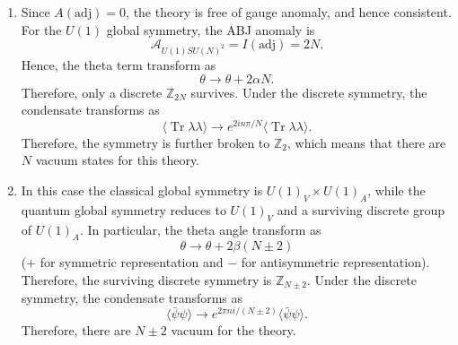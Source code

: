 \begin{solution}
    \begin{enumerate}[label=\alph*)]
    \item Since $A(\mathrm{adj}) =0$, the theory is free of gauge anomaly, and hence consistent. For the $U(1)$ global symmetry, the ABJ anomaly is
    \begin{equation}
        \mathcal{A}_{U(1)SU(N)^2} = I(\mathrm{adj}) = 2N.
    \end{equation}
    Hence, the theta term transform as
    \begin{equation}
        \theta \to \theta + 2\alpha N.
    \end{equation}
    Therefore, only a discrete $\mathbb{Z}_{2N}$ survives. Under the discrete symmetry, the condensate transforms as
    \begin{equation}
        \langle\operatorname{Tr}\lambda\lambda\rangle \to e^{2in\pi/N}\langle\operatorname{Tr}\lambda\lambda\rangle.
    \end{equation}
    Therefore, the symmetry is further broken to $\mathbb{Z}_{2}$, which means that there are $N$ vacuum states for this theory.

    \item In this case the classical global symmetry is $U(1)_V \times U(1)_A$, while the quantum global symmetry reduces to $U(1)_V$ and a surviving discrete group of $U(1)_A$. In particular, the theta angle transform as
    \begin{equation}
        \theta \to \theta +2\beta(N\pm 2)
    \end{equation}
    ($+$ for symmetric representation and $-$ for antisymmetric representation). Therefore, the surviving discrete symmetry is $\mathbb{Z}_{N\pm 2}$. Under the discrete symmetry, the condensate transforms as
    \begin{equation}
        \langle\bar\psi\psi\rangle \to e^{2\pi ni/(N\pm 2)}\langle\bar\psi\psi\rangle.
    \end{equation}
    Therefore, there are $N\pm 2$ vacuum for the theory.
\end{enumerate}
\end{solution}

